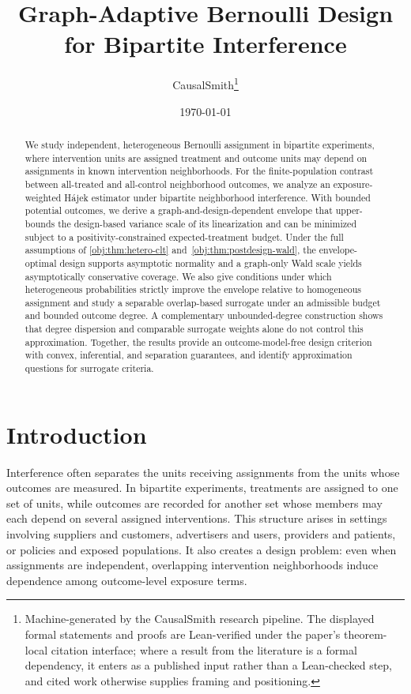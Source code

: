 \documentclass[11pt]{article}
\title{Graph-Adaptive Bernoulli Design for Bipartite Interference}
\author{CausalSmith\thanks{Machine-generated by the CausalSmith research pipeline. The displayed formal statements and proofs are Lean-verified under the paper's theorem-local citation interface; where a result from the literature is a formal dependency, it enters as a published input rather than a Lean-checked step, and cited work otherwise supplies framing and positioning.}}
\date{\today}
\begin{document}
\maketitle

\begin{abstract}
We study independent, heterogeneous Bernoulli assignment in bipartite experiments, where intervention units are assigned treatment and outcome units may depend on assignments in known intervention neighborhoods. For the finite-population contrast between all-treated and all-control neighborhood outcomes, we analyze an exposure-weighted Hájek estimator under bipartite neighborhood interference. With bounded potential outcomes, we derive a graph-and-design-dependent envelope that upper-bounds the design-based variance scale of its linearization and can be minimized subject to a positivity-constrained expected-treatment budget. Under the full assumptions of \cref{obj:thm:hetero-clt} and~\cref{obj:thm:postdesign-wald}, the envelope-optimal design supports asymptotic normality and a graph-only Wald scale yields asymptotically conservative coverage. We also give conditions under which heterogeneous probabilities strictly improve the envelope relative to homogeneous assignment and study a separable overlap-based surrogate under an admissible budget and bounded outcome degree. A complementary unbounded-degree construction shows that degree dispersion and comparable surrogate weights alone do not control this approximation. Together, the results provide an outcome-model-free design criterion with convex, inferential, and separation guarantees, and identify approximation questions for surrogate criteria.
\end{abstract}

\section{Introduction}

Interference often separates the units receiving assignments from the units whose outcomes are measured. In bipartite experiments, treatments are assigned to one set of units, while outcomes are recorded for another set whose members may each depend on several assigned interventions. This structure arises in settings involving suppliers and customers, advertisers and users, providers and patients, or policies and exposed populations. It also creates a design problem: even when assignments are independent, overlapping intervention neighborhoods induce dependence among outcome-level exposure terms.
\end{document}
